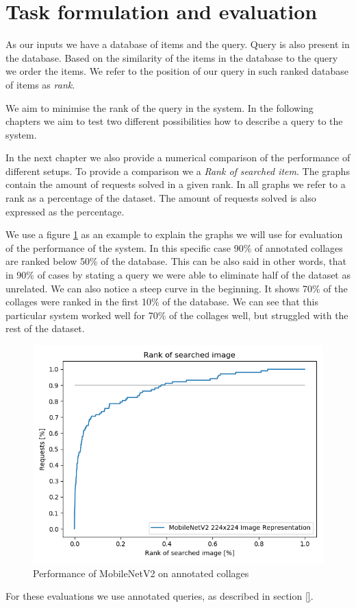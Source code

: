 \section*{Task formulation and evaluation}

As our inputs we have a database of items and the query. Query is also present in the database. Based on the similarity of the items in the database to the query we order the items. We refer to the position of our query in such ranked database of items as \emph{rank}.

We aim to minimise the rank of the query in the system. In the following chapters we aim to test two different possibilities how to describe a query to the system.

In the next chapter we also provide a numerical comparison of the performance of different setups. To provide a comparison we a \emph{Rank of searched item}. The graphs contain the amount of requests solved in a given rank. In all graphs we refer to a rank as a percentage of the dataset. The amount of requests solved is also expressed as the percentage.

We use a figure \ref{fig:mobilenet_whole_image_example} as an example to explain the graphs we will use for evaluation of the performance of the system. In this specific case 90\% of annotated collages are ranked below 50\% of the database. This can be also said in other words, that in 90\% of cases by stating a query we were able to eliminate half of the dataset as unrelated. We can also notice a steep curve in the beginning. It shows 70\% of the collages were ranked in the first 10\% of the database. We can see that this particular system worked well for 70\% of the collages well, but struggled with the rest of the dataset.

\begin{figure}
    \centering
    \includegraphics[width=0.8\linewidth]{img/mobilenet_whole_image.png}
    \caption{Performance of MobileNetV2 on annotated collages}
    \label{fig:mobilenet_whole_image_example}
\end{figure}

For these evaluations we use annotated queries, as described in section \ref{}.

